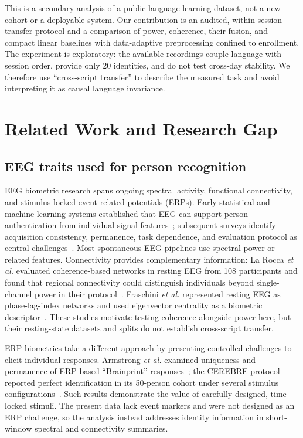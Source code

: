 \documentclass[conference]{IEEEtran}
\begin{document}
This is a secondary analysis of a public language-learning dataset, not a new cohort or a deployable system. Our contribution is an audited, within-session transfer protocol and a comparison of power, coherence, their fusion, and compact linear baselines with data-adaptive preprocessing confined to enrollment. The experiment is exploratory: the available recordings couple language with session order, provide only 20 identities, and do not test cross-day stability. We therefore use “cross-script transfer” to describe the measured task and avoid interpreting it as causal language invariance.

\section{Related Work and Research Gap}
\subsection{EEG traits used for person recognition}
EEG biometric research spans ongoing spectral activity, functional connectivity, and stimulus-locked event-related potentials (ERPs). Early statistical and machine-learning systems established that EEG can support person authentication from individual signal features~\cite{marcel2007,palaniappan2007}; subsequent surveys identify acquisition consistency, permanence, task dependence, and evaluation protocol as central challenges~\cite{campisi2014,gui2019}. Most spontaneous-EEG pipelines use spectral power or related features. Connectivity provides complementary information: La Rocca \emph{et al.} evaluated coherence-based networks in resting EEG from 108 participants and found that regional connectivity could distinguish individuals beyond single-channel power in their protocol~\cite{lar2014}. Fraschini \emph{et al.} represented resting EEG as phase-lag-index networks and used eigenvector centrality as a biometric descriptor~\cite{fraschini2015}. These studies motivate testing coherence alongside power here, but their resting-state datasets and splits do not establish cross-script transfer.

ERP biometrics take a different approach by presenting controlled challenges to elicit individual responses. Armstrong \emph{et al.} examined uniqueness and permanence of ERP-based ``Brainprint'' responses~\cite{armstrong2015}; the CEREBRE protocol reported perfect identification in its 50-person cohort under several stimulus configurations~\cite{ruizblondet2016}. Such results demonstrate the value of carefully designed, time-locked stimuli. The present data lack event markers and were not designed as an ERP challenge, so the analysis instead addresses identity information in short-window spectral and connectivity summaries.
\end{document}

